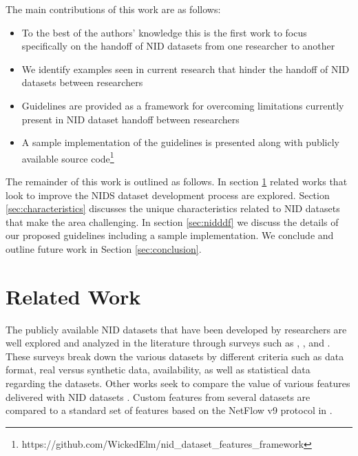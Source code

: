 \documentclass[sigconf]{acmart}
\begin{document}
The main contributions of this work are as follows:

\begin{itemize}
    \item To the best of the authors' knowledge this is the first work to focus specifically on the handoff of NID datasets from one researcher to another
    \item We identify examples seen in current research that hinder the handoff of NID datasets between researchers
    \item Guidelines are provided as a framework for overcoming limitations currently present in NID dataset handoff between researchers
    \item A sample implementation of the guidelines is presented along with publicly available source code\footnote{https://github.com/WickedElm/nid\_dataset\_features\_framework}
\end{itemize}

The remainder of this work is outlined as follows.
In section \ref{sec:related_work} related works that look to improve the NIDS dataset development process are explored.
Section \ref{sec:characteristics} discusses the unique characteristics related to NID datasets that make the area challenging.
In section \ref{sec:nidddf} we discuss the details of our proposed guidelines including a sample implementation.
We conclude and outline future work in Section \ref{sec:conclusion}.

\section{Related Work}\label{sec:related_work}

The publicly available NID datasets that have been developed by researchers are well explored and analyzed in the literature through surveys such as \cite{Chou2022}, \cite{ring2019survey}, and \cite{yang2022systematic}.
These surveys break down the various datasets by different criteria such as data format, real versus synthetic data, availability, as well as statistical data regarding the datasets.
Other works seek to compare the value of various features delivered with NID datasets \cite{7809531}.
Custom features from several datasets are compared to a standard set of features based on the NetFlow v9 protocol \cite{netflowv9format} in \cite{sarhan2020netflow}.
\end{document}
